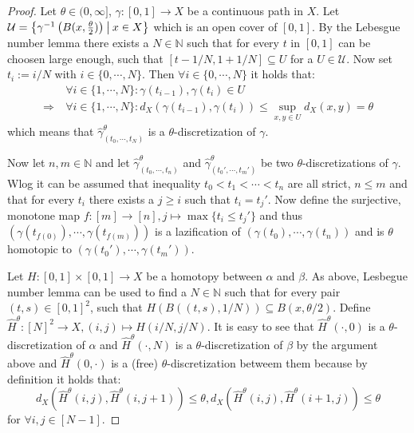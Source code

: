 \documentclass[a4paper, 11pt, twoside]{article}
\newcommand{\N}[0]{\mathbb{N}}
\theoremstyle{break}
\theoremstyle{break}
\begin{document}
\begin{proof}
  Let $\theta \in (0, \infty]$, $\gamma: [0,1] \to X$ be a continuous path in $X$. 
  Let $\mathcal{U} = \left\{\gamma^{-1}\left(B(x,{\theta \over 2})\right) \: \middle| \: x \in X \right\}$ which is an open cover of $[0,1]$.
  By the Lebesgue number lemma there exists a $N \in \N$ such that for every $t$ in $[0,1]$ can be choosen large enough, such that $[t-1/N, 1+1/N] \subseteq U$ for a $U \in \mathcal{U}$.
  Now set $t_i := i/N$ with $i \in \{0, \cdots, N\}$. Then $\forall i \in \{0, \cdots, N\}$ it holds that:
  \begin{align*}
    &\forall i \in \{1, \cdots, N\}: \gamma(t_{i-1}), \gamma(t_i) \in U \\
    \Rightarrow \: &\forall i \in \{1, \cdots, N\}: d_X(\gamma(t_{i-1}), \gamma(t_i)) \leq \sup\limits_{x,y \in U} d_X(x,y) = \theta
  \end{align*}
  which means that $\widehat{\gamma}^{\theta}_{(t_0, \cdots, t_N)}$ is a $\theta$-discretization of $\gamma$.

  Now let $n,m \in \N$ and let $\widehat{\gamma}_{(t_0, \cdots, t_n)}^{\theta}$ and $\widehat{\gamma}_{(t_0', \cdots, t_m')}^{\theta}$ be two $\theta$-discretizations of $\gamma$.
  Wlog it can be assumed that inequality $t_0 < t_1 < \cdots < t_n$ are all strict, $n \leq m$ and that for every $t_i$ there exists a $j \geq i$ such that $t_i = t_j'$.
  Now define the surjective, monotone map $f: [m] \to [n], j \mapsto \max \{t_i \leq t_j'\}$ 
  and thus $(\gamma(t_{f(0)}), \cdots, \gamma(t_{f(m)}))$ is a lazification of $(\gamma(t_0), \cdots, \gamma(t_n))$ and is $\theta$ homotopic to $(\gamma(t_0'), \cdots, \gamma(t_m'))$.
  
  Let $H: [0,1] \times [0,1] \to X$ be a homotopy between $\alpha$ and $\beta$. As above, Lesbegue number lemma can be used to find a $N \in \N$ 
  such that for every pair $(t,s) \in [0,1]^2$, such that $H(B((t,s),1/N)) \subseteq B(x, \theta/2)$.
  Define $\widehat{H}^{\theta}: [N]^2 \to X, (i,j) \mapsto H(i/N, j/N)$. It is easy to see that $\widehat{H}^{\theta}(\cdot, 0)$ is a $\theta$-discretization of $\alpha$ and
  $\widehat{H}^{\theta}(\cdot, N)$ is a $\theta$-discretization of $\beta$ by the argument above and $\widehat{H}^{\theta}(0, \cdot)$ is a (free) $\theta$-discretization betweem them because by definition it holds that:
  \begin{equation*}
    d_X(\widehat{H}^{\theta}(i,j), \widehat{H}^{\theta}(i,j+1)) \leq \theta, d_X(\widehat{H}^{\theta}(i,j), \widehat{H}^{\theta}(i+1,j)) \leq \theta
  \end{equation*}
  for $\forall i, j \in [N-1]$.
\end{proof}
\end{document}
